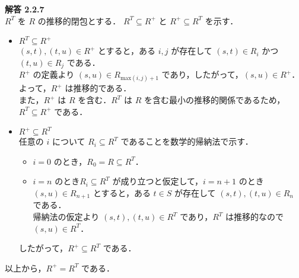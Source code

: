 \documentclass[a4paper,11pt,fleqn,dvipdfmx]{article}
\newcommand{\ansja}[1]{\noindent\textbf{解答 #1}\\[2mm]}
\newcommand{\qed}[0]{\hfill\fbox{}}
\begin{document}
    \pagebreak

    \ansja{2.2.7}
        $R^{T}$ を $R$ の推移的閉包とする． $R^{T} \subseteq R^{+}$ と $R^{+} \subseteq R^{T}$ を示す．
        \begin{itemize}
            \item $R^{T} \subseteq R^{+}$ \\[2mm]
            $(s,t),(t,u) \in R^{+}$ とすると，ある $i,j$ が存在して $(s,t) \in R_i$ かつ $(t,u) \in R_j$ である． \\
            $R^{+}$ の定義より $(s,u) \in R_{\mathrm{max}(i,j)+1}$ であり，したがって，$(s,u) \in R^{+}$． \\
            よって，$R^{+}$ は推移的である． \\
            また，$R^{+}$ は $R$ を含む．$R^{T}$ は $R$ を含む最小の推移的関係であるため，$R^{T} \subseteq R^{+}$ である．
            \item $R^{+} \subseteq R^{T}$ \\[2mm]
            任意の $i$ について $R_i \subseteq R^{T}$ であることを数学的帰納法で示す．
            \begin{itemize}
                \item $i=0$ のとき，$R_0 = R \subseteq R^{T}$．
                \item $i=n$ のとき$R_i \subseteq R^{T}$ が成り立つと仮定して，$i=n+1$ のとき \\
                $(s,u) \in R_{n+1}$ とすると，ある $t \in S$ が存在して $(s,t),(t,u) \in R_n$ である． \\
                帰納法の仮定より $(s,t),(t,u) \in R^{T}$ であり，$R^{T}$ は推移的なので $(s,u) \in R^{T}$．
            \end{itemize}
            したがって，$R^{+} \subseteq R^{T}$ である．
        \end{itemize}
        以上から，$R^{+} = R^{T}$ である．\qed

    \vspace{10mm}
\end{document}
